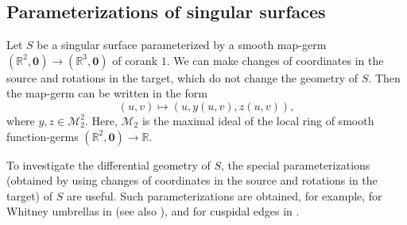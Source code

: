 \documentclass[12pt]{amsart}
\theoremstyle{plain}
\theoremstyle{definition}
\newcommand{\R}{\mathbb{R}}
\begin{document}
\subsection{Parameterizations of singular surfaces}

Let $S$ be a singular surface parameterized by a smooth map-germ $(\R^2,\bm{0})\to(\R^3,\bm{0})$ of corank $1$.
We can make changes of coordinates in the source and rotations in the target, which do not change the geometry of $S$. 
Then the map-germ can be written in the form
\[
(u,v)\mapsto(u,y(u,v),z(u,v)),
\]
where $y, z \in \mathcal{M}_2^2$.
Here, $\mathcal{M}_2$ is the maximal ideal of the local ring of smooth function-germs $(\R^2,\bm{0})\to\R$.

To investigate the differential geometry of $S$, the special parameterizations (obtained by using changes of coordinates in the  source and rotations in the target) of $S$ are useful. 
Such parameterizations are obtained, for example, for Whitney umbrellas  in \cite{West1995} (see also \cite{FH2012}), and for cuspidal edges in \cite{MS2016}.
\end{document}

